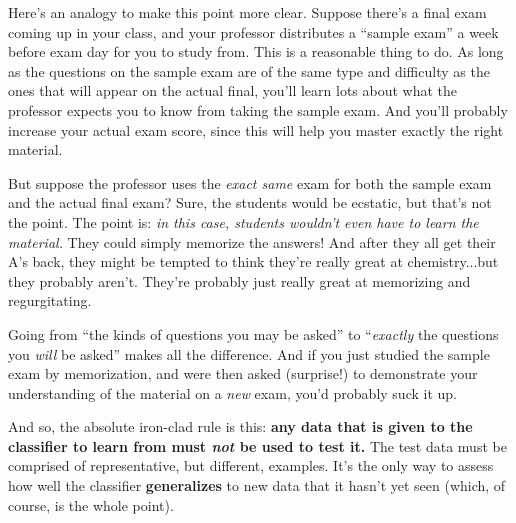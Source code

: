 Here's an analogy to make this point more clear. Suppose there's a final exam
coming up in your class, and your professor distributes a ``sample exam'' a
week before exam day for you to study from. This is a reasonable thing to do.
As long as the questions on the sample exam are of the same type and difficulty
as the ones that will appear on the actual final, you'll learn lots about what
the professor expects you to know from taking the sample exam. And you'll
probably increase your actual exam score, since this will help you master
exactly the right material.

But suppose the professor uses the \textit{exact same} exam for both the sample
exam and the actual final exam? Sure, the students would be ecstatic, but
that's not the point. The point is: \textit{in this case, students wouldn't
even have to learn the material.} They could simply memorize the answers! And
after they all get their A's back, they might be tempted to think they're
really great at chemistry...but they probably aren't. They're probably just
really great at memorizing and regurgitating.

Going from ``the kinds of questions you may be asked'' to ``\textit{exactly}
the questions you \textit{will} be asked'' makes all the difference. And if you
just studied the sample exam by memorization, and were then asked (surprise!)
to demonstrate your understanding of the material on a \textit{new} exam, you'd
probably suck it up.


And so, the absolute iron-clad rule is this: \textbf{any data that is given to
the classifier to learn from must \textit{not} be used to test it.} The test
data must be comprised of representative, but different, examples. It's the
only way to assess how well the classifier \textbf{generalizes} to new data
that it hasn't yet seen (which, of course, is the whole point).


